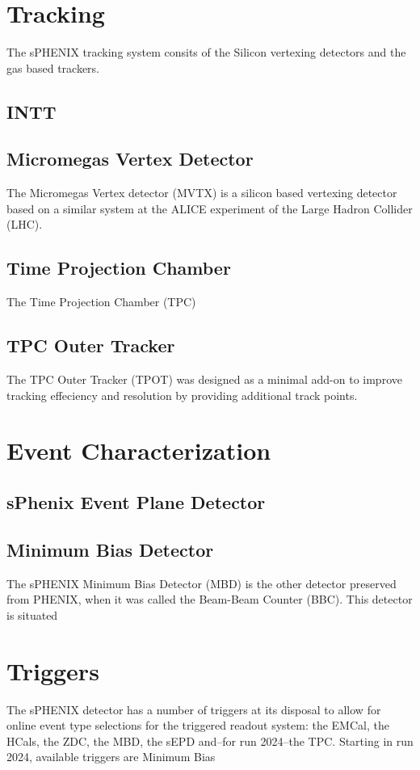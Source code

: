 \documentclass[letterpaper, 12pt, oneside]{book}
\theoremstyle{definition}
\begin{document}
\section{Tracking}
	The sPHENIX tracking system consits of the Silicon vertexing detectors and the gas based trackers.
	\subsection{INTT}
	\subsection{Micromegas Vertex Detector}
	The Micromegas Vertex detector (MVTX) is a silicon based vertexing detector based on a similar system at the ALICE experiment of the Large Hadron Collider (LHC). 
	\subsection{Time Projection Chamber}
	The Time Projection Chamber (TPC) 
	\subsection{TPC Outer Tracker}
	The TPC Outer Tracker (TPOT) was designed as a minimal add-on to improve tracking effeciency and resolution by providing additional track points. 
\section{Event Characterization}
	\subsection{sPhenix Event Plane Detector}
	\subsection{Minimum Bias Detector}
	The sPHENIX Minimum Bias Detector (MBD) is the other detector preserved from PHENIX, when it was called the Beam-Beam Counter (BBC). 
	This detector is situated  
\section{Triggers}
	The sPHENIX detector has a number of triggers at its disposal to allow for online event type selections for the triggered readout system: the EMCal, the HCals, the ZDC, the MBD, the sEPD and--for run 2024--the TPC.
	Starting in run 2024, available triggers are Minimum Bias 
\end{document}
